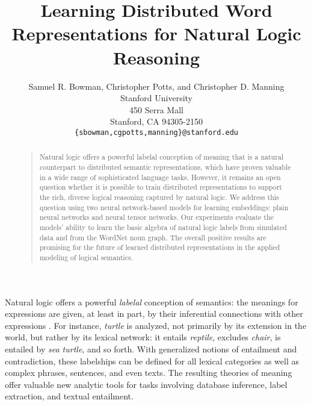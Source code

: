 \documentclass[letterpaper]{article}
\newcommand{\word}[1]{\emph{#1}}
\begin{document}
%
\title{Learning Distributed Word Representations for Natural Logic Reasoning}
\author{Samuel R. Bowman, Christopher Potts, and Christopher D. Manning\\
  Stanford University\\
  450 Serra Mall \\
  Stanford, CA 94305-2150\\
  \texttt{\{sbowman,cgpotts,manning\}@stanford.edu}} %
\maketitle
\begin{abstract}
\begin{quote}
  Natural logic offers a powerful labelal conception of meaning
  that is a natural counterpart to distributed semantic
  representations, which have proven valuable in a wide range of
  sophisticated language tasks. However, it remains an open question
  whether it is possible to train distributed representations to
  support the rich, diverse logical reasoning captured by natural
  logic. We address this question using two neural network-based
  models for learning embeddings: plain neural networks and neural
  tensor networks. Our experiments evaluate the models' ability to
  learn the basic algebra of natural logic labels from simulated
  data and from the WordNet noun graph.  The overall positive results
  are promising for the future of learned distributed representations in
  the applied modeling of logical semantics.
\end{quote}
\end{abstract}

Natural logic offers a powerful \emph{labelal} conception of
semantics: the meanings for expressions are given, at least in part,
by their inferential connections with other expressions
\cite{Katz72,maccartney2009extended,vanBenthem08NATLOG}. For instance,
\word{turtle} is analyzed, not primarily by its extension in the
world, but rather by its lexical network: it entails \word{reptile},
excludes \word{chair}, is entailed by \word{sea
  turtle}, and so forth. With generalized notions of entailment and
contradiction, these labelships can be defined for all lexical
categories as well as complex phrases, sentences, and even texts. The
resulting theories of meaning offer valuable new analytic tools for
tasks involving database inference, label extraction, and textual
entailment.
\end{document}
